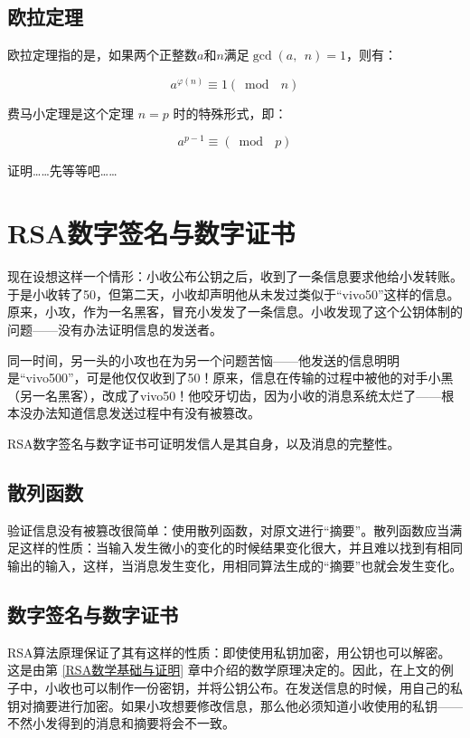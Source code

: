 \documentclass[a4paper]{article}         %
\begin{document}
\subsection{欧拉定理}

欧拉定理指的是，如果两个正整数$a$和$n$满足$\gcd(a, \phantom{;} n) = 1$，则有：

\[
	a^{\varphi(n)} \equiv 1 (\bmod \phantom{;} n)
\]

费马小定理是这个定理 $n = p$ 时的特殊形式，即：

\[
    a ^ {p-1} \equiv (\bmod \phantom{;} p)
\]

证明……先等等吧……

\section{RSA数字签名与数字证书}

现在设想这样一个情形：小收公布公钥之后，收到了一条信息要求他给小发转账。于是小收转了50，但第二天，小收却声明他从未发过类似于“vivo50”这样的信息。原来，小攻，作为一名黑客，冒充小发发了一条信息。小收发现了这个公钥体制的问题——没有办法证明信息的发送者。

同一时间，另一头的小攻也在为另一个问题苦恼——他发送的信息明明是“vivo500”，可是他仅仅收到了50！原来，信息在传输的过程中被他的对手小黑（另一名黑客），改成了vivo50！他咬牙切齿，因为小收的消息系统太烂了——根本没办法知道信息发送过程中有没有被篡改。

RSA数字签名与数字证书可证明发信人是其自身，以及消息的完整性。

\subsection{散列函数} \label{散列函数}

验证信息没有被篡改很简单：使用散列函数，对原文进行“摘要”。散列函数应当满足这样的性质：当输入发生微小的变化的时候结果变化很大，并且难以找到有相同输出的输入，这样，当消息发生变化，用相同算法生成的“摘要”也就会发生变化。

\subsection{数字签名与数字证书}

RSA算法原理保证了其有这样的性质：即使使用私钥加密，用公钥也可以解密。这是由第 \ref{RSA数学基础与证明} 章中介绍的数学原理决定的。因此，在上文的例子中，小收也可以制作一份密钥，并将公钥公布。在发送信息的时候，用自己的私钥对摘要进行加密。如果小攻想要修改信息，那么他必须知道小收使用的私钥——不然小发得到的消息和摘要将会不一致。
\end{document}
